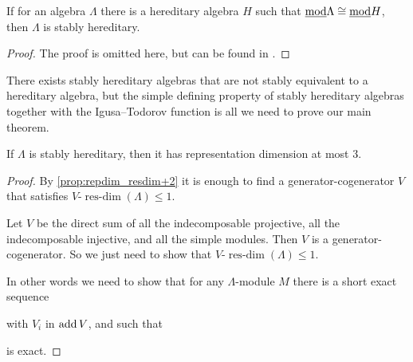 \begin{prop}
	If for an algebra $\Lambda$ there is a hereditary algebra $H$ such that $\underline{\mod}\Lambda \cong \underline{\mod}H$, then $\Lambda$ is stably hereditary.
	\begin{proof}
		The proof is omitted here, but can be found in \cite[Chapter~IV, Theorem~1.5]{AR73}.
	\end{proof}
\end{prop}

There exists stably hereditary algebras that are not stably equivalent to a hereditary algebra, but the simple defining property of stably hereditary algebras together with the Igusa--Todorov function is all we need to prove our main theorem.

\begin{theorem}\cite[Theorem~3.5]{Xi02}\label{thm:stably_hereditary_repdim_3}
	If $\Lambda$ is stably hereditary, then it has representation dimension at most 3.
	\begin{proof}
		By \cref{prop:repdim_resdim+2} it is enough to find a generator-cogenerator $V$ that satisfies $V$-$\operatorname{res-dim}(\Lambda) \leq 1$.
		
		Let $V$ be the direct sum of all the indecomposable projective, all the indecomposable injective, and all the simple modules. Then $V$ is a generator-cogenerator. So we just need to show that  $V$-$\operatorname{res-dim}(\Lambda) \leq 1$.
		
		In other words we need to show that for any $\Lambda$-module $M$ there is a short exact sequence 
		\begin{center}
		\end{center}
		with $V_i$ in $\add V$, and such that 
		\begin{center}
		\end{center}
		is exact. 
		

\end{proof}
\end{theorem}

